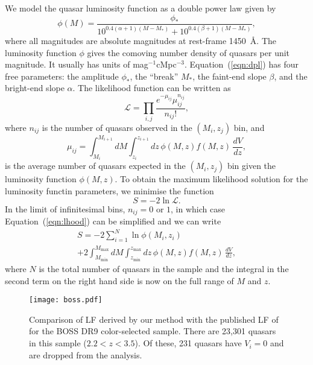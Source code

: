 \documentclass[a4paper,fleqn,usenatbib]{mnras}
\begin{document}
  We model the quasar luminosity function as a double power law given
  by \citep[e.g.,][]{2013ApJ...773...14R}
  \begin{equation}
    \phi(M) = \frac{\phi_*}{10^{0.4(\alpha+1)(M-M_*)}+10^{0.4(\beta+1)(M-M_*)}},
\label{eqn:dpl}
\end{equation}
where all magnitudes are absolute magnitudes at rest-frame 1450~{\AA}.
The luminosity function $\phi$ gives the comoving number density of
quasars per unit magnitude.  It usually has units of
mag$^{-1}$cMpc$^{-3}$.  Equation~(\ref{eqn:dpl}) has four free
parameters: the amplitude $\phi_*$, the ``break'' $M_*$, the faint-end
slope $\beta$, and the bright-end slope $\alpha$.  The likelihood
function can be written as \citep{2001AJ....121...54F}
\begin{equation}
  \mathcal{L}=\prod_{i,j}\frac{e^{-\mu_{ij}}\mu_{ij}^{n_{ij}}}{n_{ij}!},
  \label{eqn:lhood}
\end{equation}
where $n_{ij}$ is the number of quasars observed in the $(M_i, z_j)$
bin, and
\begin{equation}
  \mu_{ij}= \int_{M_i}^{M_{i+1}}dM\int_{z_i}^{z_{i+1}}dz\, \phi(M,z) f(M, z)\,\frac{dV}{dz},
\end{equation}
is the average number of quasars expected in the $(M_i, z_j)$ bin
given the luminosity function $\phi(M,z)$.  To obtain the maximum
likelihood solution for the luminosity functin parameters, we minimise
the function
\begin{equation}
  S = -2\ln\mathcal{L}.
\end{equation}
In the limit of infinitesimal bins, $n_{ij}=0$ or $1$, in which case
Equation~(\ref{eqn:lhood}) can be simplified and we can write
\begin{multline}
  S = -2\sum_{i=1}^N\ln\phi(M_i, z_i)\\+2\int_{M_\mathrm{min}}^{M_\mathrm{max}}dM\int_{z_\mathrm{min}}^{z_\mathrm{max}}dz\, \phi(M,z) f(M, z)\,\frac{dV}{dz},
\end{multline}
where $N$ is the total number of quasars in the sample and the integral in the second term on the right hand side is now on the full range of $M$ and $z$.
  

\begin{figure*}
  \begin{center}
    \texttt{[image: boss.pdf]}
  \end{center}
  \caption{Comparison of LF derived by our method with the published
    LF of \citet{2013ApJ...773...14R} for the BOSS DR9 color-selected
    sample. There are 23,301 quasars in this sample ($2.2<z<3.5$).  Of
    these, 231 quasars have $V_i=0$ and are dropped from the
    analysis.}
  \label{fig:boss}
\end{figure*}
\end{document}
